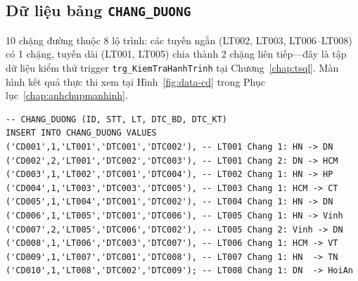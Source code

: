 \documentclass[11pt]{report}
\begin{document}
\subsection{Dữ liệu bảng \texttt{CHANG\_DUONG}}

10 chặng đường thuộc 8 lộ trình: các tuyến ngắn (LT002, LT003, LT006--LT008) có 1 chặng, tuyến dài (LT001, LT005) chia thành 2 chặng liên tiếp---đây là tập dữ liệu kiểm thử trigger \texttt{trg\_KiemTraHanhTrinh} tại Chương~\ref{chap:tsql}. Màn hình kết quả thực thi xem tại Hình~\ref{fig:data-cd} trong Phục lục~\ref{chap:anhchupmanhinh}.

\begin{verbatim}
-- CHANG_DUONG (ID, STT, LT, DTC_BD, DTC_KT)
INSERT INTO CHANG_DUONG VALUES
('CD001',1,'LT001','DTC001','DTC002'), -- LT001 Chang 1: HN -> DN
('CD002',2,'LT001','DTC002','DTC003'), -- LT001 Chang 2: DN -> HCM
('CD003',1,'LT002','DTC001','DTC004'), -- LT002 Chang 1: HN -> HP
('CD004',1,'LT003','DTC003','DTC005'), -- LT003 Chang 1: HCM -> CT
('CD005',1,'LT004','DTC001','DTC002'), -- LT004 Chang 1: HN -> DN
('CD006',1,'LT005','DTC001','DTC006'), -- LT005 Chang 1: HN -> Vinh
('CD007',2,'LT005','DTC006','DTC002'), -- LT005 Chang 2: Vinh -> DN
('CD008',1,'LT006','DTC003','DTC007'), -- LT006 Chang 1: HCM -> VT
('CD009',1,'LT007','DTC001','DTC008'), -- LT007 Chang 1: HN  -> TN
('CD010',1,'LT008','DTC002','DTC009'); -- LT008 Chang 1: DN  -> HoiAn
\end{verbatim}
\end{document}
